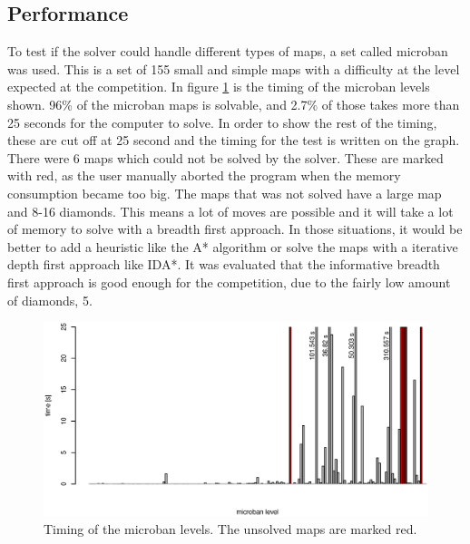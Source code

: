 \subsection{Performance}
To test if the solver could handle different types of maps, a set called microban \cite{url:microban} was used.
This is a set of 155 small and simple maps with a difficulty at the level expected at the competition.
In figure \ref{fig:microban_timing} is the timing of the microban levels shown.
96\% of the microban maps is solvable, and 2.7\% of those takes more than 25 seconds for the computer to solve.
In order to show the rest of the timing, these are cut off at 25 second and the timing for the test is written on the graph.
There were 6 maps which could not be solved by the solver. These are marked with red, as the user manually aborted the program when the memory consumption became too big.
The maps that was not solved have a large map and 8-16 diamonds. 
This means a lot of moves are possible and it will take a lot of memory to solve with a breadth first approach.
In those situations, it would be better to add a heuristic like the A* algorithm or solve the maps with a iterative depth first approach like IDA*.
It was evaluated that the informative breadth first approach is good enough for the competition, due to the fairly low amount of diamonds, 5.

\begin{figure}[h]
 \centering
 \includegraphics[width=\textwidth]{img/micoban_timing.eps}
 \caption{Timing of the microban levels. The unsolved maps are marked red.}
 \label{fig:microban_timing}
\end{figure}
